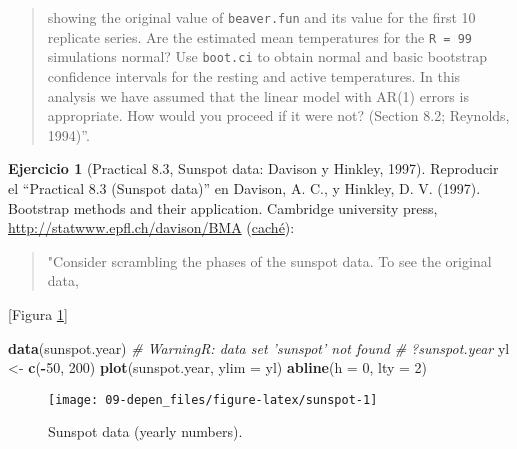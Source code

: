 \documentclass[
]{book}
\newenvironment{Shaded}{\begin{snugshade}}{\end{snugshade}}
\newcommand{\CommentTok}[1]{\textcolor[rgb]{0.56,0.35,0.01}{\textit{#1}}}
\newcommand{\DataTypeTok}[1]{\textcolor[rgb]{0.13,0.29,0.53}{#1}}
\newcommand{\DecValTok}[1]{\textcolor[rgb]{0.00,0.00,0.81}{#1}}
\newcommand{\KeywordTok}[1]{\textcolor[rgb]{0.13,0.29,0.53}{\textbf{#1}}}
\newcommand{\NormalTok}[1]{#1}
\newcommand{\OperatorTok}[1]{\textcolor[rgb]{0.81,0.36,0.00}{\textbf{#1}}}
\newcommand{\StringTok}[1]{\textcolor[rgb]{0.31,0.60,0.02}{#1}}
\theoremstyle{break}
\theoremstyle{definition}
\theoremstyle{definition}
\theoremstyle{definition}
\newtheorem{exercise}{Ejercicio}[chapter]
\theoremstyle{remark}
\begin{document}
\begin{quote}
showing the original value of \texttt{beaver.fun}
and its value for the first 10 replicate series.
Are the estimated mean temperatures for the \texttt{R\ =\ 99}
simulations normal?
Use \texttt{boot.ci} to obtain normal and basic bootstrap
confidence intervals for the resting and active temperatures.
In this analysis we have assumed that
the linear model with AR(1) errors is appropriate.
How would you proceed if it were not?
(Section 8.2; Reynolds, 1994)''.
\end{quote}

\begin{exercise}[Practical 8.3, Sunspot data: Davison y Hinkley, 1997]
\protect\hypertarget{exr:tsboot-sunspot}{}{\label{exr:tsboot-sunspot} \iffalse (Practical 8.3, Sunspot data: Davison y Hinkley, 1997) \fi{} }
Reproducir el ``Practical 8.3 (Sunspot data)'' en Davison, A. C., y Hinkley, D. V. (1997). Bootstrap methods and their application. Cambridge university press, \url{http://statwww.epfl.ch/davison/BMA}
(\href{http://webcache.googleusercontent.com/search?q=cache:a4nFL5ymMMoJ:statwww.epfl.ch/davison/BMA/+\&cd=1\&hl=gl\&ct=clnk\&gl=es}{caché}):
\end{exercise}

\begin{quote}
"Consider scrambling the phases of the sunspot data.
To see the original data,
\end{quote}

{[}Figura \ref{fig:sunspot}{]}

\begin{Shaded}
\begin{Highlighting}[]
\KeywordTok{data}\NormalTok{(sunspot.year)  }\CommentTok{# WarningR: data set 'sunspot' not found}
\CommentTok{# ?sunspot.year}
\NormalTok{yl <-}\StringTok{ }\KeywordTok{c}\NormalTok{(}\OperatorTok{-}\DecValTok{50}\NormalTok{, }\DecValTok{200}\NormalTok{)}
\KeywordTok{plot}\NormalTok{(sunspot.year, }\DataTypeTok{ylim =}\NormalTok{ yl)}
\KeywordTok{abline}\NormalTok{(}\DataTypeTok{h =} \DecValTok{0}\NormalTok{, }\DataTypeTok{lty =} \DecValTok{2}\NormalTok{)}
\end{Highlighting}
\end{Shaded}

\begin{figure}[!htb]

{\centering \texttt{[image: 09-depen\_files/figure-latex/sunspot-1]} 

}

\caption{Sunspot data (yearly numbers).}\label{fig:sunspot}
\end{figure}
\end{document}
